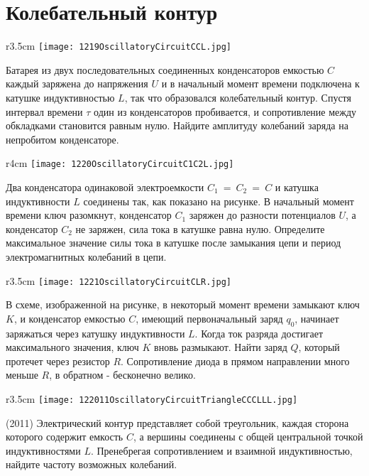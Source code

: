 \section{Колебательный контур}

\begin{wrapfigure}{r}{3.5cm}
\texttt{[image: 1219OscillatoryCircuitCCL.jpg]}
\end{wrapfigure}

\AddProb Батарея из двух последовательных соединенных конденсаторов емкостью $C$ каждый заряжена до напряжения $U$ 
и в начальный момент времени подключена к катушке индуктивностью $L$, так что образовался колебательный контур. 
Спустя интервал времени $\tau$ один из конденсаторов пробивается, и сопротивление между обкладками становится равным нулю. 
Найдите амплитуду колебаний заряда на непробитом конденсаторе.

\begin{wrapfigure}{r}{4cm}
\texttt{[image: 1220OscillatoryCircuitC1C2L.jpg]}
\end{wrapfigure}

\AddProb Два конденсатора одинаковой электроемкости $C_1~=~C_2~=~C$ и катушка индуктивности $L$ соединены так, как показано на рисунке. 
В начальный момент времени ключ разомкнут, конденсатор $C_1$ заряжен до разности потенциалов $U$, а конденсатор $C_2$ не заряжен, 
сила тока в катушке равна нулю. Определите максимальное значение силы тока в катушке после замыкания цепи и период электромагнитных колебаний в цепи. 

\begin{wrapfigure}{r}{3.5cm}
\texttt{[image: 1221OscillatoryCircuitCLR.jpg]}
\end{wrapfigure}

\AddProb В схеме, изображенной на рисунке, в некоторый момент времени замыкают ключ $K$, и конденсатор емкостью $C$, 
имеющий первоначальный заряд $q_0$, начинает заряжаться через катушку индуктивности $L$. 
Когда ток разряда достигает максимального значения, ключ $K$ вновь размыкают. Найти заряд $Q$, который протечет через резистор $R$. 
Сопротивление диода в прямом направлении много меньше $R$, в обратном - бесконечно велико.

\begin{wrapfigure}{r}{3.5cm}
\texttt{[image: 122011OscillatoryCircuitTriangleCCCLLL.jpg]}
\end{wrapfigure}

\AddProb (2011) Электрический контур представляет собой треугольник, каждая сторона которого содержит емкость $C$, 
а вершины соединены с общей центральной точкой индуктивностями $L$. 
Пренебрегая сопротивлением и взаимной индуктивностью, найдите частоту возможных колебаний.


